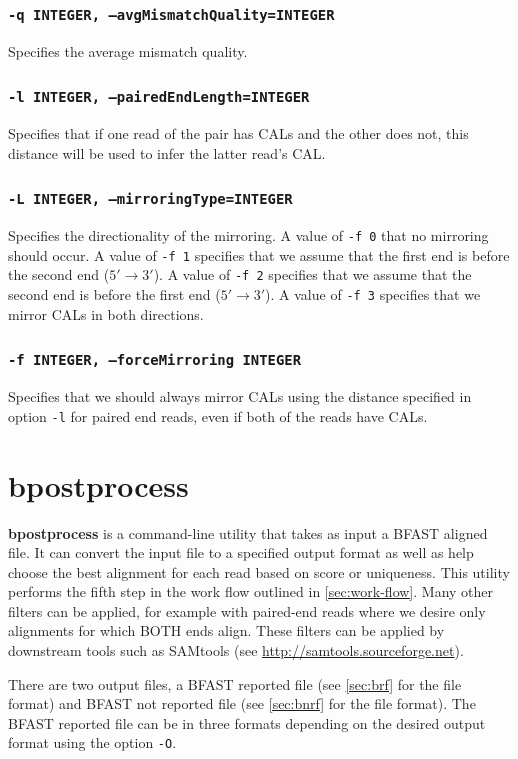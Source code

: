 \documentclass[a4paper,12pt]{book}
\newcommand{\TT}[1]{{\tt #1}} %
\newcommand{\BF}[1]{{\bf #1}} %
\newcommand{\BAF}{BFAST aligned file} %
\newcommand{\BRF}{BFAST reported file} %
\newcommand{\BNRF}{BFAST not reported file} %
\begin{document}
\subsubsection{\TT{-q INTEGER, --avgMismatchQuality=INTEGER}}
Specifies the average mismatch quality.

\subsubsection{\TT{-l INTEGER, --pairedEndLength=INTEGER}}
Specifies that if one read of the pair has CALs and the other does not, this distance will be used to infer the latter read’s CAL.

\subsubsection{\TT{-L INTEGER, --mirroringType=INTEGER}}
Specifies the directionality of the mirroring.
A value of \TT{-f 0} that no mirroring should occur.
A value of \TT{-f 1} specifies that we assume that the first end is before the second end ($5'\rightarrow3'$).
A value of \TT{-f 2} specifies that we assume that the second end is before the first end ($5'\rightarrow3'$).
A value of \TT{-f 3} specifies that we mirror CALs in both directions.
\subsubsection{\TT{-f INTEGER, --forceMirroring INTEGER}}
Specifies that we should always mirror CALs using the distance specified in option \TT{-l} for paired end reads, even if both of the reads have CALs.

\section{bpostprocess}
\label{sec:bpostprocess}
\BF{bpostprocess} is a command-line utility that takes as input a \BAF{}.
It can convert the input file to a specified output format as well as help choose the best alignment for each read based on score or uniqueness.
This utility performs the fifth step in the work flow outlined in \autoref{sec:work-flow}.
Many other filters can be applied, for example with paired-end reads where we desire only alignments for which BOTH ends align. 
These filters can be applied by downstream tools such as SAMtools (see \url{http://samtools.sourceforge.net}).

There are two output files, a \BRF{} (see \autoref{sec:brf} for the file format) and \BNRF{} (see \autoref{sec:bnrf} for the file format).
The \BRF{} can be in three formats depending on the desired output format using the option \TT{-O}.
\end{document}
